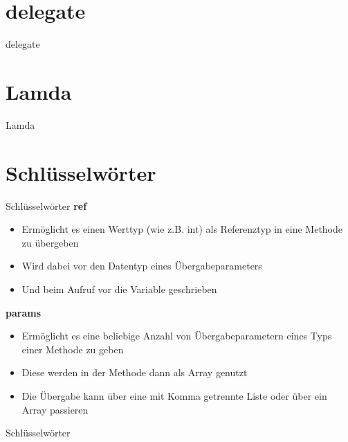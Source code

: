 \section{delegate}
\begin{frame}{delegate}

\end{frame}

\section{Lamda}
\begin{frame}{Lamda}

\end{frame}

\section{Schlüsselwörter}
\begin{frame}{Schlüsselwörter}
	\textbf{ref}\\
	\begin{itemize}
		\item Ermöglicht es einen Werttyp (wie z.B. int) als Referenztyp in eine Methode zu übergeben
		\item Wird dabei vor den Datentyp eines Übergabeparameters
		\item Und beim Aufruf vor die Variable geschrieben
	\end{itemize}
	\textbf{params}\\
	\begin{itemize}
		\item Ermöglicht es eine beliebige Anzahl von Übergabeparametern eines Typs einer Methode zu geben
		\item Diese werden in der Methode dann als Array genutzt
		\item Die Übergabe kann über eine mit Komma getrennte Liste oder über ein Array passieren
	\end{itemize}
\end{frame}

\begin{frame}{Schlüsselwörter}
	
	
\end{frame}

